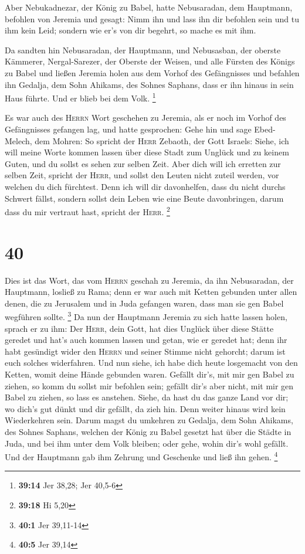  Aber Nebukadnezar, der König zu Babel, hatte
Nebusaradan, dem Hauptmann, befohlen von Jeremia und gesagt:
 Nimm ihn und lass ihn dir befohlen sein und tu ihm kein
Leid; sondern wie er's von dir begehrt, so mache es mit ihm.

 Da sandten hin Nebusaradan, der Hauptmann, und
Nebusasban, der oberste Kämmerer, Nergal-Sarezer, der Oberste der
Weisen, und alle Fürsten des Königs zu Babel  und ließen
Jeremia holen aus dem Vorhof des Gefängnisses und befahlen ihn Gedalja,
dem Sohn Ahikams, des Sohnes Saphans, dass er ihn hinaus in sein Haus
führte. Und er blieb bei dem Volk. \footnote{\textbf{39:14} Jer 38,28;
  Jer 40,5-6}

 Es war auch des \textsc{Herrn} Wort geschehen zu
Jeremia, als er noch im Vorhof des Gefängnisses gefangen lag, und hatte
gesprochen:  Gehe hin und sage Ebed-Melech, dem Mohren:
So spricht der \textsc{Herr} Zebaoth, der Gott Israels: Siehe, ich will
meine Worte kommen lassen über diese Stadt zum Unglück und zu keinem
Guten, und du sollst es sehen zur selben Zeit.  Aber dich
will ich erretten zur selben Zeit, spricht der \textsc{Herr}, und sollst
den Leuten nicht zuteil werden, vor welchen du dich fürchtest.
 Denn ich will dir davonhelfen, dass du nicht durchs
Schwert fällst, sondern sollst dein Leben wie eine Beute davonbringen,
darum dass du mir vertraut hast, spricht der \textsc{Herr}. \footnote{\textbf{39:18}
  Hi 5,20}

\hypertarget{section-9}{%
\section{40}\label{section-9}}

 Dies ist das Wort, das vom \textsc{Herrn} geschah zu
Jeremia, da ihn Nebusaradan, der Hauptmann, losließ zu Rama; denn er war
auch mit Ketten gebunden unter allen denen, die zu Jerusalem und in Juda
gefangen waren, dass man sie gen Babel wegführen sollte. \footnote{\textbf{40:1}
  Jer 39,11-14}  Da nun der Hauptmann Jeremia zu sich
hatte lassen holen, sprach er zu ihm: Der \textsc{Herr}, dein Gott, hat
dies Unglück über diese Stätte geredet  und hat's auch
kommen lassen und getan, wie er geredet hat; denn ihr habt gesündigt
wider den \textsc{Herrn} und seiner Stimme nicht gehorcht; darum ist
euch solches widerfahren.  Und nun siehe, ich habe dich
heute losgemacht von den Ketten, womit deine Hände gebunden waren.
Gefällt dir's, mit mir gen Babel zu ziehen, so komm du sollst mir
befohlen sein; gefällt dir's aber nicht, mit mir gen Babel zu ziehen, so
lass es anstehen. Siehe, da hast du das ganze Land vor dir; wo dich's
gut dünkt und dir gefällt, da zieh hin.  Denn weiter
hinaus wird kein Wiederkehren sein. Darum magst du umkehren zu Gedalja,
dem Sohn Ahikams, des Sohnes Saphans, welchen der König zu Babel gesetzt
hat über die Städte in Juda, und bei ihm unter dem Volk bleiben; oder
gehe, wohin dir's wohl gefällt. Und der Hauptmann gab ihm Zehrung und
Geschenke und ließ ihn gehen. \footnote{\textbf{40:5} Jer 39,14}

